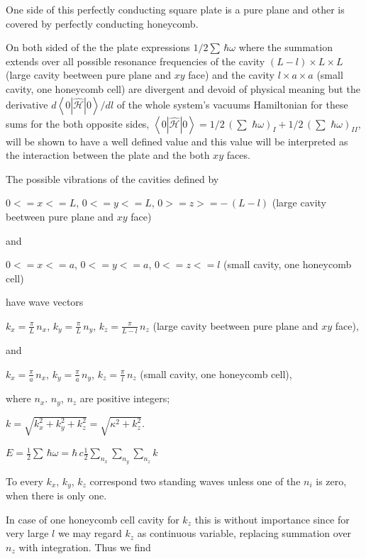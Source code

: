 \documentclass[11pt]{article}
\begin{document}
One side of this perfectly conducting square plate is a pure plane and
other is covered by perfectly conducting honeycomb.

On both sided of the the plate expressions \(1\big/2\sum\,\hbar\omega\)
where the summation extends over all possible resonance frequencies of
the cavity \(\left(L-l\right)\times L\times L\) (large cavity beetween
pure plane and \(xy\) face) and the cavity \(l\times a\times a\) (small
cavity, one honeycomb cell) are divergent and devoid of physical meaning
but the derivative \({d\left<0|\hat{\mathcal{H}}|0\right>}\big/{dl}\) of
the whole system's vacuums Hamiltonian for these sums for the both
opposite sides,
\(\left<0|\hat{\mathcal{H}}|0\right> = 1\big/2\,\left(\sum\,\,\hbar\omega\right)_{I} + 1\big/2\,\left(\sum\,\,\hbar\omega\right)_{II}\),
will be shown to have a well defined value and this value will be
interpreted as the interaction between the plate and the both \(xy\)
faces.

    The possible vibrations of the cavities defined by

\(0<=x<=L\), \(0<=y<=L\), \(0>=z>=-\,(L-l)\) (large cavity beetween pure
plane and \(xy\) face)

and

\(0<=x<=a\), \(0<=y<=a\), \(0<=z<=l\) (small cavity, one honeycomb cell)

    have wave vectors

\(k_x = \frac{\pi}{L}\,n_x\), \(k_y = \frac{\pi}{L}\,n_y\),
\(k_z = \frac{\pi}{L-l}\,n_z\) (large cavity beetween pure plane and
\(xy\) face),

and

\(k_x = \frac{\pi}{a}\,n_x\), \(k_y = \frac{\pi}{a}\,n_y\),
\(k_z = \frac{\pi}{l}\,n_z\) (small cavity, one honeycomb cell),

where \(n_x\). \(n_y\), \(n_z\) are positive integers;

\(k = \sqrt{k_x^2+k_y^2+k_z^2} = \sqrt{\kappa^2+k_z^2}\).

\(E = \frac{1}{2}\sum\,\hbar\omega = \hbar\,c\frac{1}{2}\sum\limits_{n_x}^{}\sum\limits_{n_y}^{}\sum\limits_{n_z}^{}k\)

    To every \(k_x\), \(k_y\), \(k_z\) correspond two standing waves unless
one of the \(n_i\) is zero, when there is only one.

In case of one honeycomb cell cavity for \(k_z\) this is without
importance since for very large \(l\) we may regard \(k_z\) as
continuous variable, replacing summation over \(n_z\) with integration.
Thus we find
\end{document}
